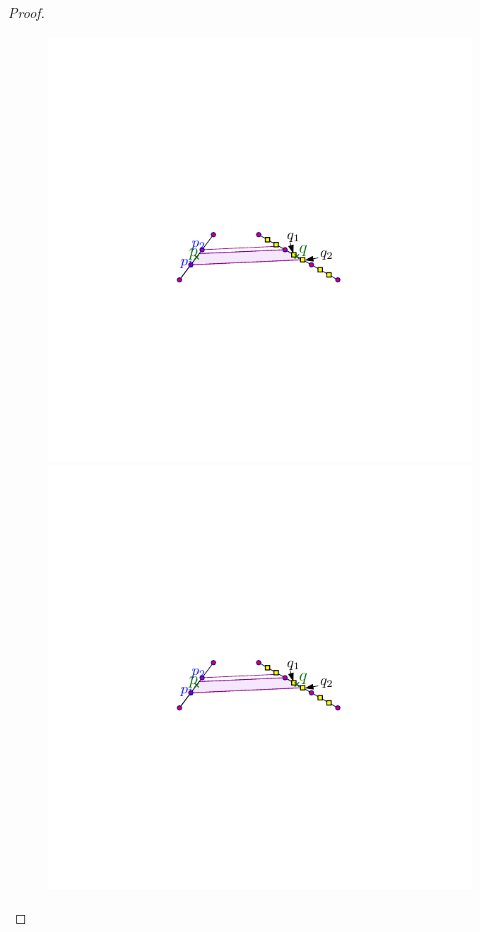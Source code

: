\documentclass[12pt]{article}%
\begin{document}
\begin{proof}
\begin{figure}[h]
        \hfill%
        \includegraphics[page=4]{figs/points_trap_2}
        \hfill%
        \includegraphics[page=5]{figs/points_trap_2}
        \caption{}%
    \end{figure}


\end{proof}
\end{document}
